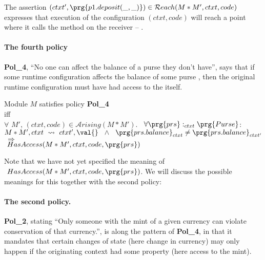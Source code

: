 \noindent
The assertion $(ctxt', \prg{p1.deposit(\_,\_)})\in{\mathcal R}each(M*M',ctxt,code)$ expresses that execution of the configuration
$(ctxt, code)$ will reach a point where it calls the method  on the receiver  -- .
 


 \paragraph{The fourth policy}
  {\bf Pol\_4}, ``No one can affect the balance of a purse they
don't have'',  says that if some runtime configuration affects the balance of some purse  , then the 
original runtime configuration must have had access to the 
itself.


\begin{shaded} 
\begin{center}
Module $M$ satisfies policy {\bf Pol\_4}\\  iff
\\ $\forall$  $M'$, $(ctxt,code)\in{\mathcal A}rising(M*M')$. \ 
 $\forall \prg{prs}:_{ctxt}\prg{Purse}$:\\
$  M*M', ctxt \ \leadsto \ ctxt', \val{} \  \ \wedge \  \ \prg{prs.balance}_{ctxt}\neq \prg{prs.balance}_{ctxt'}$
\\
$ \ \Rightarrow\ $
\\
$\ HasAccess(M*M',ctxt,code,\prg{prs})$
 \end{center}
\end{shaded}
 
 \noindent
 Note that we have not yet specified the meaning of $\ HasAccess(M*M',ctxt,code,\prg{prs})$. We will discuss the possible meanings for this together with the second policy: 
 

 \paragraph{The second policy.}
{\bf Pol\_2}, stating ``Only someone with the mint of a given currency can violate conservation of that
currency.'', is along the pattern of {\bf Pol\_4}, in that it mandates that certain changes of state (here change in currency) may only happen
if the originating context had some property (here access to the mint).

